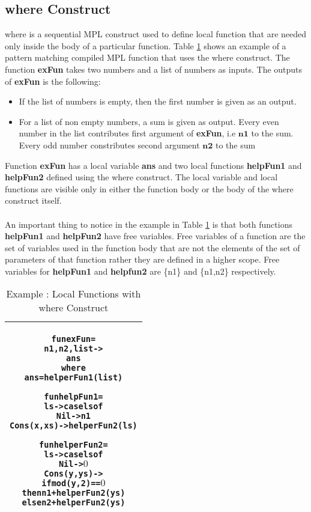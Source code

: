 \documentclass[11pt]{article}
\begin{document}
\subsection {where Construct}\label{lam:whereOverview}
{\sf where} is a sequential MPL construct used to define local function that are needed only inside the body of a particular function. Table \ref {lam:whereExample} shows an example of a pattern matching compiled MPL function that uses the {\sf where} construct. The function {\bf exFun} takes two numbers and a list of numbers as inputs. The outputs of {\bf exFun} is the following:
\begin {itemize}
  \item If the list of numbers is empty, then the first number is given as an output.
  \item For a list of non empty numbers, a sum is given as output. Every even number in the list contributes first argument of {\bf exFun}, i.e $\mathbf{n1}$ to the sum. Every odd number constributes second argument $\mathbf{n2}$ to the sum
\end {itemize}
Function {\bf exFun} has a local variable {\bf ans} and two local functions {\bf helpFun1} and {\bf helpFun2} defined using the {\sf where} construct. The local variable and local functions are visible only in either the function body or the body of the {\sf where} construct itself.
~~\\~~\\ 
An important thing to notice in the example in Table \ref {lam:whereExample} is that both functions {\bf helpFun1} and {\bf helpFun2} have free variables. Free variables of a function are the set of variables used in the function body that are not the elements of the set of parameters of that function rather they are defined in a higher scope. Free variables for {\bf helpFun1} and {\bf helpfun2} are \{n1\} and \{n1,n2\} respectively.
\begin{table}[!h]
\begin{center}
\begin{tabular}{|c|} \hline
\begin{minipage}{3.8in}
\begin{alltt}


  fun exFun = 
      n1,n2,list -> 
           ans
        where
          ans = helperFun1 (list)

          fun helpFun1 = 
              ls -> case ls of 
                      Nil -> n1
                      Cons(x,xs) -> helperFun2(ls)

          fun helperFun2 =
              ls -> case ls of
                      Nil -> \(0\)
                      Cons(y,ys) ->
                        if mod(y,2) == \(0\) 
                          then n1 + helperFun2(ys)
                          else n2 + helperFun2(ys) 

\end{alltt} 
\end {minipage} 
\tabularnewline
\hline
\end{tabular}
\caption{Example : Local Functions with {\sf where} Construct}
\label{lam:whereExample}
\end{center}
\end{table}
\end{document}
